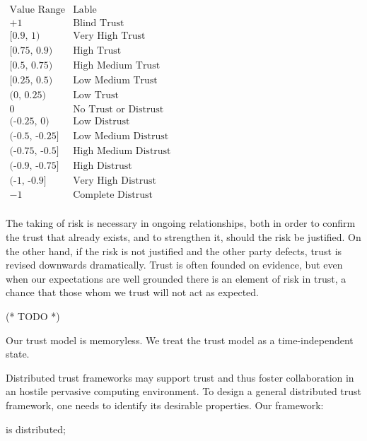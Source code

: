 \documentclass{article}
\begin{document}
\begin{tabular}
\(\begin{array}{lc}
\hline
 \text{Value Range} & \text{Lable} \\
\hline
 +1 & \text{Blind Trust} \\
\hline
 \text{[0.9, 1)} & \text{Very High Trust} \\
 \text{[0.75, 0.9)} & \text{High Trust} \\
 \text{[0.5, 0.75)} & \text{High Medium Trust} \\
 \text{[0.25, 0.5)} & \text{Low Medium Trust} \\
 \text{(0, 0.25)} & \text{Low Trust} \\
 0 & \text{No Trust or Distrust} \\
 \text{(-0.25, 0)} & \text{Low Distrust} \\
 \text{(-0.5, -0.25]} & \text{Low Medium Distrust} \\
 \text{(-0.75, -0.5]} & \text{High Medium Distrust} \\
 \text{(-0.9, -0.75]} & \text{High Distrust} \\
 \text{(-1, -0.9]} & \text{Very High Distrust} \\
 -1 & \text{Complete Distrust} \\
\end{array}\)
\end{tabular}



The taking of risk is necessary in ongoing relationships, both in order to confirm the trust that already exists, and to strengthen it, should the
risk be justified. On the other hand, if the risk is not justified and the other party defects, trust is revised downwards dramatically. Trust is
often founded on evidence, but even when our expectations are well grounded there is an element of risk in trust, a chance that those whom we trust
will not act as expected.



(* TODO *)



Our trust model is memoryless. We treat the trust model as a time-independent state.



Distributed trust frameworks may support trust and thus foster collaboration in an hostile pervasive computing environment. To design a general distributed
trust framework, one needs to identify its desirable properties. Our framework:


\item is distributed;
\end{document}
